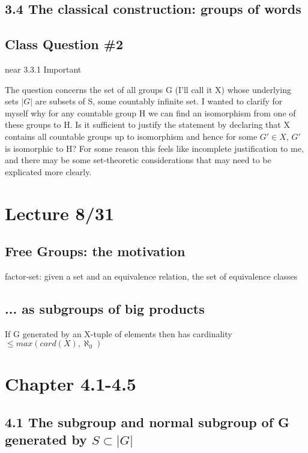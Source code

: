 \documentclass[12pt]{article}
\begin{document}
\subsection{3.4 The classical construction: groups of words}


\subsection{Class Question \#2}

near 3.3.1
Important

The question concerns the set of all groups G (I'll call it X) whose underlying sets $|G|$ are subsets of S, some countably infinite set.  I wanted to clarify for myself why for any countable group H we can find an isomorphism from one of these groups to H.  Is it sufficient to justify the statement by declaring that X contains all countable groups up to isomorphism and hence for some $G' \in X$, $G'$ is isomorphic to H?  For some reason this feels like incomplete justification to me, and there may be some set-theoretic considerations that may need to be explicated more clearly.

\section{Lecture 8/31}

\subsection{Free Groups: the motivation}

\noindent
factor-set: given a set and an equivalence relation, the set of equivalence classes

\subsection{... as subgroups of big products}

\noindent
If G generated by an X-tuple of elements then has cardinality $\leq max(card(X), \aleph_0)$


\section{Chapter 4.1-4.5}

\subsection{4.1 The subgroup and normal subgroup of G generated by $S \subset |G|$}
\end{document}
